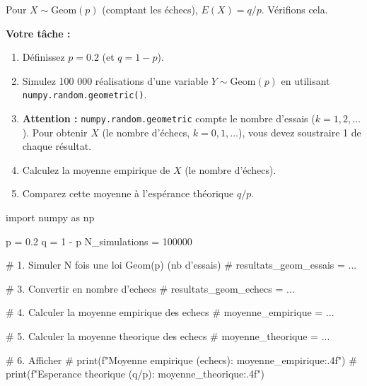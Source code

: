 \begin{exercicebox}
Pour $X \sim \text{Geom}(p)$ (comptant les échecs), $E(X) = q/p$. Vérifions cela.

\textbf{Votre tâche :}
\begin{enumerate}
    \item Définissez $p=0.2$ (et $q=1-p$).
    \item Simulez 100 000 réalisations d'une variable $Y \sim \text{Geom}(p)$ en utilisant \texttt{numpy.random.geometric()}.
    \item \textbf{Attention :} \texttt{numpy.random.geometric} compte le nombre d'essais ($k=1, 2, \dots$). Pour obtenir $X$ (le nombre d'échecs, $k=0, 1, \dots$), vous devez soustraire 1 de chaque résultat.
    \item Calculez la moyenne empirique de $X$ (le nombre d'échecs).
    \item Comparez cette moyenne à l'espérance théorique $q/p$.
\end{enumerate}

\begin{codecell}
import numpy as np

p = 0.2
q = 1 - p
N_simulations = 100000

# 1. Simuler N fois une loi Geom(p) (nb d'essais)
# resultats_geom_essais = ...

# 3. Convertir en nombre d'echecs
# resultats_geom_echecs = ...

# 4. Calculer la moyenne empirique des echecs
# moyenne_empirique = ...

# 5. Calculer la moyenne theorique des echecs
# moyenne_theorique = ...

# 6. Afficher
# print(f"Moyenne empirique (echecs): {moyenne_empirique:.4f}")
# print(f"Esperance theorique (q/p): {moyenne_theorique:.4f}")
\end{codecell}
\end{exercicebox}

